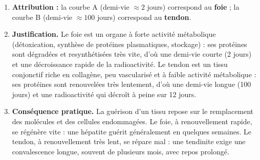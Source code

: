 \documentclass[11pt]{article}
\begin{document}
\begin{corrige}
\begin{enumerate}
\item \textbf{Attribution :} la courbe A (demi-vie $\approx 2$ jours) correspond au \textbf{foie} ; la courbe B (demi-vie $\approx 100$ jours) correspond au \textbf{tendon}.

\item \textbf{Justification.} Le foie est un organe à forte activité métabolique (détoxication, synthèse de protéines plasmatiques, stockage) : ses protéines sont dégradées et resynthétisées très vite, d'où une demi-vie courte (2 jours) et une décroissance rapide de la radioactivité. Le tendon est un tissu conjonctif riche en collagène, peu vascularisé et à faible activité métabolique : ses protéines sont renouvelées très lentement, d'où une demi-vie longue (100 jours) et une radioactivité qui décroît à peine sur 12 jours.

\item \textbf{Conséquence pratique.} La guérison d'un tissu repose sur le remplacement des molécules et des cellules endommagées. Le foie, à renouvellement rapide, se régénère vite : une hépatite guérit généralement en quelques semaines. Le tendon, à renouvellement très lent, se répare mal : une tendinite exige une convalescence longue, souvent de plusieurs mois, avec repos prolongé.
\end{enumerate}
\end{corrige}
\end{document}
